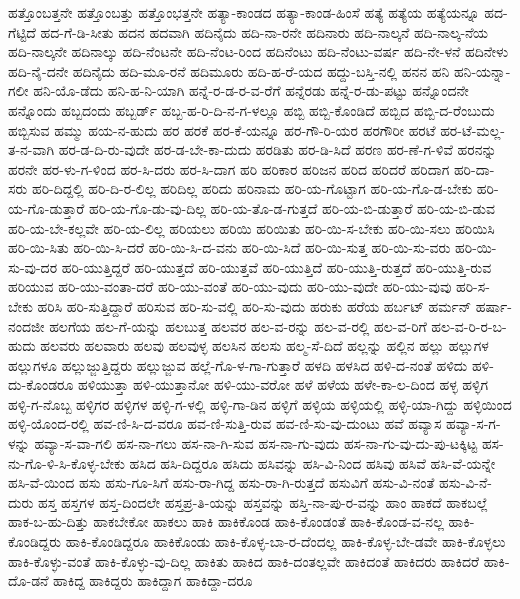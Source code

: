 {ಹತ್ತೊಂಬತ್ತನೇ
ಹತ್ತೊಂಬತ್ತು
ಹತ್ತೊಂಭತ್ತನೇ
ಹತ್ಯಾ-ಕಾಂಡದ
ಹತ್ಯಾ-ಕಾಂಡ-ಹಿಂಸೆ
ಹತ್ಯೆ
ಹತ್ಯೆಯ
ಹತ್ಯೆಯನ್ನೂ
ಹದ-ಗೆಟ್ಟಿದೆ
ಹದ-ಗೆ-ಡಿ-ಸೀತು
ಹದನ
ಹದವಾಗಿ
ಹದಿನೈದು
ಹದಿ-ನಾ-ರನೇ
ಹದಿನಾರು
ಹದಿ-ನಾಲ್ಕನೆ
ಹದಿ-ನಾಲ್ಕ-ನೆಯ
ಹದಿ-ನಾಲ್ಕನೇ
ಹದಿನಾಲ್ಕು
ಹದಿ-ನೆಂಟನೇ
ಹದಿ-ನೆಂಟ-ರಿಂದ
ಹದಿನೆಂಟು
ಹದಿ-ನೆಂಟು-ವರ್ಷ
ಹದಿ-ನೇ-ಳನೆ
ಹದಿನೇಳು
ಹದಿ-ನೈ-ದನೇ
ಹದಿನೈದು
ಹದಿ-ಮೂ-ರನೆ
ಹದಿಮೂರು
ಹದಿ-ಹ-ರೆ-ಯದ
ಹದ್ದು-ಬಸ್ತಿ-ನಲ್ಲಿ
ಹನನ
ಹನಿ
ಹನಿ-ಯನ್ನಾ-ಗಲೀ
ಹನಿ-ಯೊ-ಡೆದು
ಹನಿ-ಹ-ನಿ-ಯಾಗಿ
ಹನ್ನೆ-ರ-ಡ-ರ-ವ-ರೆಗೆ
ಹನ್ನೆರಡು
ಹನ್ನೆ-ರ-ಡು-ಪಟ್ಟು
ಹನ್ನೊಂದನೇ
ಹನ್ನೊಂದು
ಹಬ್ಬದಂದು
ಹಬ್ಬರ್ಡ್
ಹಬ್ಬ-ಹ-ರಿ-ದಿ-ನ-ಗ-ಳಲ್ಲೂ
ಹಬ್ಬಿ
ಹಬ್ಬಿ-ಕೊಂಡಿದೆ
ಹಬ್ಬಿದ
ಹಬ್ಬಿ-ದ-ರೆಂಬುದು
ಹಬ್ಬಿಸುವ
ಹಮ್ಮು
ಹಯ-ನ-ಹುದು
ಹರ
ಹರಕೆ
ಹರ-ಕೆ-ಯನ್ನೂ
ಹರ-ಗೌ-ರಿ-ಯರ
ಹರಗೌರೀ
ಹರಟೆ
ಹರ-ಟೆ-ಮಲ್ಲ-ತ-ನ-ವಾಗಿ
ಹರ-ಡ-ದಿ-ರು-ವುದೇ
ಹರ-ಡ-ಬೇ-ಕಾ-ದುದು
ಹರಡಿತು
ಹರ-ಡಿ-ಸಿದೆ
ಹರಣ
ಹರ-ಣೆ-ಗ-ಳಿವೆ
ಹರನನ್ನು
ಹರನೇ
ಹರ-ಳು-ಗ-ಳಿಂದ
ಹರ-ಸಿ-ದರು
ಹರ-ಸಿ-ದಾಗ
ಹರಿ
ಹರಿಕಾರ
ಹರಿಜನ
ಹರಿದ
ಹರಿದರೆ
ಹರಿದಾಗ
ಹರಿ-ದಾ-ಸರು
ಹರಿ-ದಿದ್ದಲ್ಲಿ
ಹರಿ-ದಿ-ರ-ಲಿಲ್ಲ
ಹರಿದಿಲ್ಲ
ಹರಿದು
ಹರಿನಾಮ
ಹರಿ-ಯ-ಗೊಟ್ಟಾಗ
ಹರಿ-ಯ-ಗೊ-ಡ-ಬೇಕು
ಹರಿ-ಯ-ಗೊ-ಡುತ್ತಾರೆ
ಹರಿ-ಯ-ಗೊ-ಡು-ವು-ದಿಲ್ಲ
ಹರಿ-ಯ-ತೊ-ಡ-ಗುತ್ತದೆ
ಹರಿ-ಯ-ಬಿ-ಡುತ್ತಾರೆ
ಹರಿ-ಯ-ಬಿ-ಡುವ
ಹರಿ-ಯ-ಬೇ-ಕಲ್ಲವೇ
ಹರಿ-ಯ-ಲಿಲ್ಲ
ಹರಿಯಲು
ಹರಿಯಿ
ಹರಿಯಿತು
ಹರಿ-ಯಿ-ಸ-ಬೇಕು
ಹರಿ-ಯಿ-ಸಲು
ಹರಿಯಿಸಿ
ಹರಿ-ಯಿ-ಸಿತು
ಹರಿ-ಯಿ-ಸಿ-ದರೆ
ಹರಿ-ಯಿ-ಸಿ-ದ-ವನು
ಹರಿ-ಯಿ-ಸಿದೆ
ಹರಿ-ಯಿ-ಸುತ್ತ
ಹರಿ-ಯಿ-ಸು-ವರು
ಹರಿ-ಯಿ-ಸು-ವು-ದರ
ಹರಿ-ಯುತ್ತಿದ್ದರೆ
ಹರಿ-ಯುತ್ತದೆ
ಹರಿ-ಯುತ್ತವೆ
ಹರಿ-ಯುತ್ತಿದೆ
ಹರಿ-ಯುತ್ತಿ-ರುತ್ತದೆ
ಹರಿ-ಯುತ್ತಿ-ರುವ
ಹರಿಯುವ
ಹರಿ-ಯು-ವಂತಾ-ದರೆ
ಹರಿ-ಯು-ವಂತೆ
ಹರಿ-ಯು-ವುದು
ಹರಿ-ಯು-ವುದೇ
ಹರಿ-ಯು-ವುವು
ಹರಿ-ಸ-ಬೇಕು
ಹರಿಸಿ
ಹರಿ-ಸುತ್ತಿದ್ದಾರೆ
ಹರಿಸುವ
ಹರಿ-ಸು-ವಲ್ಲಿ
ಹರಿ-ಸು-ವುದು
ಹರುಕು
ಹರೆಯ
ಹರ್ಬಟ್
ಹರ್ಮನ್
ಹರ್ಷಾ-ನಂದಜೀ
ಹಲಗೆಯ
ಹಲ-ಗೆ-ಯನ್ನು
ಹಲಬುತ್ತ
ಹಲವರ
ಹಲ-ವ-ರನ್ನು
ಹಲ-ವ-ರಲ್ಲಿ
ಹಲ-ವ-ರಿಗೆ
ಹಲ-ವ-ರಿ-ರ-ಬ-ಹುದು
ಹಲವರು
ಹಲವಾರು
ಹಲವು
ಹಲವುಳ್ಳ
ಹಲಸಿನ
ಹಲಸು
ಹಲ್ಮ-ಸೆ-ದಿದೆ
ಹಲ್ಲನ್ನು
ಹಲ್ಲಿನ
ಹಲ್ಲು
ಹಲ್ಲುಗಳ
ಹಲ್ಲುಗಳೂ
ಹಲ್ಲುಜ್ಜುತ್ತಿದ್ದರು
ಹಲ್ಲುಜ್ಜುವ
ಹಲ್ಲೆ-ಗೊ-ಳ-ಗಾ-ಗುತ್ತಾರೆ
ಹಳದಿ
ಹಳಸಿದ
ಹಳಿ-ದ-ನಂತೆ
ಹಳಿದು
ಹಳಿ-ದು-ಕೊಂಡರೂ
ಹಳಿಯುತ್ತಾ
ಹಳಿ-ಯುತ್ತಾನೋ
ಹಳಿ-ಯು-ವರೋ
ಹಳೆ
ಹಳೆಯ
ಹಳೇ-ಕಾ-ಲ-ದಿಂದ
ಹಳ್ಳ
ಹಳ್ಳಿಗ
ಹಳ್ಳಿ-ಗ-ನೊಬ್ಬ
ಹಳ್ಳಿಗರ
ಹಳ್ಳಿಗಳ
ಹಳ್ಳಿ-ಗ-ಳಲ್ಲಿ
ಹಳ್ಳಿ-ಗಾ-ಡಿನ
ಹಳ್ಳಿಗೆ
ಹಳ್ಳಿಯ
ಹಳ್ಳಿಯಲ್ಲಿ
ಹಳ್ಳಿ-ಯಾ-ಗಿದ್ದು
ಹಳ್ಳಿಯಿಂದ
ಹಳ್ಳಿ-ಯೊಂದ-ರಲ್ಲಿ
ಹವ-ಣಿ-ಸಿ-ದ-ವರೂ
ಹವ-ಣಿ-ಸುತ್ತಿ-ರುವ
ಹವ-ಣಿ-ಸು-ವು-ದುಂಟು
ಹವೆ
ಹವ್ಯಾಸ
ಹವ್ಯಾ-ಸ-ಗ-ಳನ್ನು
ಹವ್ಯಾ-ಸ-ವಾ-ಗಲಿ
ಹಸ-ನಾ-ಗಲು
ಹಸ-ನಾ-ಗಿ-ಸುವ
ಹಸ-ನಾ-ಗು-ವುದು
ಹಸ-ನಾ-ಗು-ವು-ದು-ಪು-ಟಕ್ಕಿಟ್ಟ
ಹಸ-ನು-ಗೊ-ಳಿ-ಸಿ-ಕೊಳ್ಳ-ಬೇಕು
ಹಸಿದ
ಹಸಿ-ದಿದ್ದರೂ
ಹಸಿದು
ಹಸಿವನ್ನು
ಹಸಿ-ವಿ-ನಿಂದ
ಹಸಿವು
ಹಸಿವೆ
ಹಸಿ-ವೆ-ಯನ್ನೇ
ಹಸಿ-ವೆ-ಯಿಂದ
ಹಸು
ಹಸು-ಗೂ-ಸಿಗೆ
ಹಸು-ರಾ-ಗಿದ್ದ
ಹಸು-ರಾ-ಗಿ-ರುತ್ತದೆ
ಹಸುವಿಗೆ
ಹಸು-ವಿ-ನಂತೆ
ಹಸು-ವಿ-ನೆ-ದುರು
ಹಸ್ತ
ಹಸ್ತಗಳ
ಹಸ್ತ-ದಿಂದಲೇ
ಹಸ್ತಪ್ರ-ತಿ-ಯನ್ನು
ಹಸ್ತವನ್ನು
ಹಸ್ತಿ-ನಾ-ಪು-ರ-ವನ್ನು
ಹಾಂ
ಹಾಕದೆ
ಹಾಕಬಲ್ಲೆ
ಹಾಕ-ಬ-ಹು-ದಿತ್ತು
ಹಾಕಬೇಕೋ
ಹಾಕಲು
ಹಾಕಿ
ಹಾಕಿಕೊಂಡ
ಹಾಕಿ-ಕೊಂಡಂತೆ
ಹಾಕಿ-ಕೊಂಡ-ವ-ನಲ್ಲ
ಹಾಕಿ-ಕೊಂಡಿದ್ದರು
ಹಾಕಿ-ಕೊಂಡಿದ್ದರೂ
ಹಾಕಿಕೊಂಡು
ಹಾಕಿ-ಕೊಳ್ಳ-ಬಾ-ರ-ದೆಂದಲ್ಲ
ಹಾಕಿ-ಕೊಳ್ಳ-ಬೇ-ಡವೇ
ಹಾಕಿ-ಕೊಳ್ಳಲು
ಹಾಕಿ-ಕೊಳ್ಳು-ವಂತೆ
ಹಾಕಿ-ಕೊಳ್ಳು-ವು-ದಿಲ್ಲ
ಹಾಕಿತು
ಹಾಕಿದ
ಹಾಕಿ-ದಂತಲ್ಲವೇ
ಹಾಕಿದಂತೆ
ಹಾಕಿದರು
ಹಾಕಿದರೆ
ಹಾಕಿ-ದೊ-ಡನೆ
ಹಾಕಿದ್ದ
ಹಾಕಿದ್ದರು
ಹಾಕಿದ್ದಾಗ
ಹಾಕಿದ್ದಾ-ದರೂ
}
